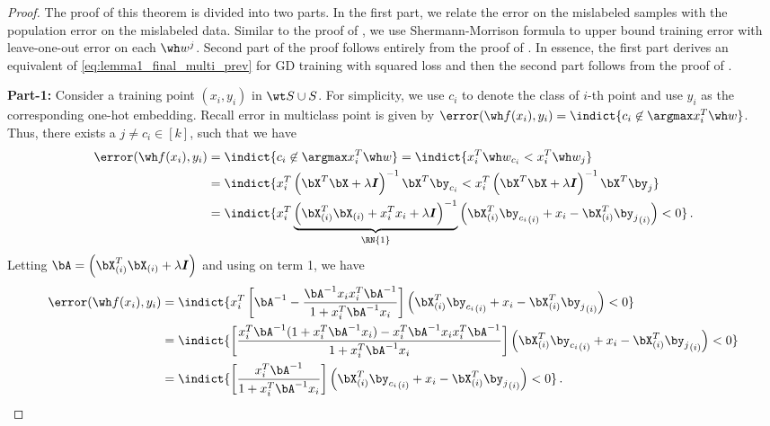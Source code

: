 \begin{proof}
    The proof of this theorem is divided into two parts. In the first part, we relate the error on the mislabeled samples with the population error on the mislabeled data. Similar to the proof of , we use Shermann-Morrison formula to upper bound training error with leave-one-out error on each $\wh w^j$. Second part of the proof follows entirely from the proof of . In essence, the first part derives an equivalent of \eqref{eq:lemma1_final_multi_prev} for GD training with squared loss and then the second part follows from the proof  of . 
    
    \textbf{Part-1:} Consider a training point $(x_i,y_i)$ in $\wt S \cup S $. For simplicity, we use $c_i$ to denote the class of $i$-th point and use $y_i$ as the corresponding one-hot embedding. Recall error in multiclass point is given by $\error(\wh f(x_i), y_i ) = \indict{ c_i \not \in \argmax x_i^T \wh w }$. Thus, there exists a $j \ne c_i \in [k]$, such that we have
     \begin{align}
        \error(\wh f(x_i), y_i ) &= \indict{ c_i \not \in \argmax x_i^T \wh w } = \indict{ x_i^T \wh w_{c_i} < x_i^T \wh w_{j}  } \\ &= \indict{ x_i^T \left( \bX^T\bX+\lambda \boldsymbol{I}\right)^{-1}\bX^T\by_{c_i} < x_i^T \left( \bX^T\bX+\lambda \boldsymbol{I}\right)^{-1}\bX^T\by_{j} } \\
        &= \indict{ x_i^T \underbrace{\left( \bXX{i}^T\bXX{i} + x_i ^T x_i +\lambda \boldsymbol{I}\right)^{-1}}_{\RN{1}} \left(\bXX{i}^T{\by_{c_i}}_{(i)} + x_i - \bXX{i}^T{\by_{j}}_{(i)}\right) < 0 } \,.
    \end{align}
    Letting $\bA = \left(\bXX{i}^T\bXX{i} +\lambda \boldsymbol{I}\right)$ 
    and using  on term 1, we have 
    \begin{align}
        \error(\wh f(x_i), y_i ) &= \indict{ x_i^T \left[\bA^{-1} -  \frac{\bA^{-1} x_i x_i^T \bA^{-1}}{ 1 + x_i ^T \bA^{-1} x_i } \right]  \left(\bXX{i}^T{\by_{c_i}}_{(i)} + x_i - \bXX{i}^T{\by_{j}}_{(i)}\right) < 0 } \\
        &= \indict{ \left[ \frac{ x_i^T \bA^{-1} ( 1 + x_i ^T \bA^{-1} x_i ) -  x_i^T \bA^{-1} x_i x_i^T \bA^{-1}}{ 1 + x_i ^T \bA ^{-1}x_i } \right]  \left(\bXX{i}^T{\by_{c_i}}_{(i)} + x_i - \bXX{i}^T{\by_{j}}_{(i)}\right) < 0 } \\
        &= \indict{ \left[ \frac{ x_i^T \bA^{-1}}{ 1 + x_i ^T \bA ^{-1}x_i } \right]  \left(\bXX{i}^T{\by_{c_i}}_{(i)} + x_i - \bXX{i}^T{\by_{j}}_{(i)}\right) < 0} \,.

\end{align}
\end{proof}
